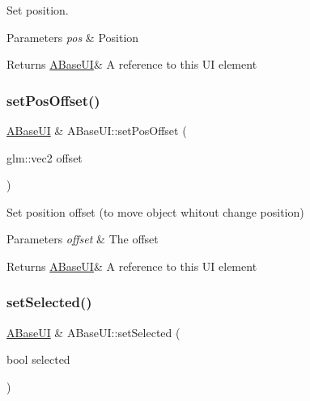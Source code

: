 Set position. 


\begin{DoxyParams}{Parameters}
{\em pos} & Position \\
\hline
\end{DoxyParams}
\begin{DoxyReturn}{Returns}
\hyperlink{class_a_base_u_i}{A\+Base\+UI}\& A reference to this UI element 
\end{DoxyReturn}
\mbox{\label{class_a_base_u_i_a6e209b2a871a2a4afa69f5dff2c6d89e}} 
\subsubsection{\texorpdfstring{set\+Pos\+Offset()}{setPosOffset()}}
{\footnotesize\ttfamily \hyperlink{class_a_base_u_i}{A\+Base\+UI} \& A\+Base\+U\+I\+::set\+Pos\+Offset (\begin{DoxyParamCaption}\item[{glm\+::vec2}]{offset }\end{DoxyParamCaption})\hspace{0.3cm}{\ttfamily [virtual]}}



Set position offset (to move object whitout change position) 


\begin{DoxyParams}{Parameters}
{\em offset} & The offset \\
\hline
\end{DoxyParams}
\begin{DoxyReturn}{Returns}
\hyperlink{class_a_base_u_i}{A\+Base\+UI}\& A reference to this UI element 
\end{DoxyReturn}
\mbox{\label{class_a_base_u_i_abe931f9a44c29212a667cdd0f1da6365}} 
\subsubsection{\texorpdfstring{set\+Selected()}{setSelected()}}
{\footnotesize\ttfamily \hyperlink{class_a_base_u_i}{A\+Base\+UI} \& A\+Base\+U\+I\+::set\+Selected (\begin{DoxyParamCaption}\item[{bool}]{selected }\end{DoxyParamCaption})\hspace{0.3cm}{\ttfamily [virtual]}}



